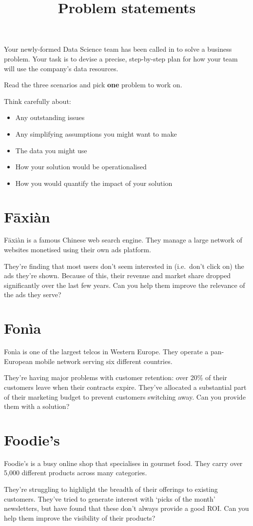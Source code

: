 \documentclass[a4paper,oneside,12pt]{article}
\title{Problem statements}
\author{}
\date{}
\begin{document}
\maketitle
\thispagestyle{empty}

Your newly\hyp{}formed Data Science team has been called in to solve a business
problem.
%
Your task is to devise a precise, step\hyp{}by\hyp{}step plan for how your team
will use the company's data resources.

Read the three scenarios and pick \textbf{one} problem to work on.

Think carefully about:
\begin{itemize}
    \item Any outstanding issues
    \item Any simplifying assumptions you might want to make
    \item The data you might use
    \item How your solution would be operationalised
    \item How you would quantify the impact of your solution
\end{itemize}

\newpage

\section{Fāxiàn}

Fāxiàn is a famous Chinese web search engine.
%
They manage a large network of websites monetised using their own ads platform.

They're finding that most users don't seem interested in (i.e.\ don't click on)
the ads they're shown.
%
Because of this, their revenue and market share dropped significantly over the
last few years.
%
Can you help them improve the relevance of the ads they serve?

\section{Fonìa}

Fonìa is one of the largest telcos in Western Europe.
%
They operate a pan\hyp{}European mobile network serving six different countries.

They're having major problems with customer retention: over 20\% of their
customers leave when their contracts expire.
%
They've allocated a substantial part of their marketing budget to prevent
customers switching away.
%
Can you provide them with a solution?

\section{Foodie's}

Foodie's is a busy online shop that specialises in gourmet food.
%
They carry over 5,000 different products across many categories.

They're struggling to highlight the breadth of their offerings to existing
customers.
%
They've tried to generate interest with `picks of the month' newsletters, but
have found that these don't always provide a good ROI.
%
Can you help them improve the visibility of their products?
\end{document}

